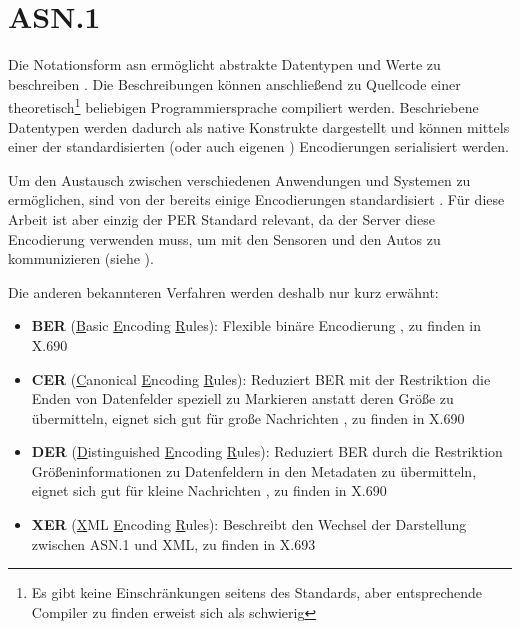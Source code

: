
\section{ASN.1}

Die Notationsform \gls{asn} ermöglicht abstrakte Datentypen und Werte zu beschreiben \cite{asn:layman}.
Die Beschreibungen können anschließend zu Quellcode einer theoretisch\footnote{Es gibt keine Einschränkungen seitens des Standards, aber entsprechende Compiler zu finden erweist sich als schwierig } beliebigen Programmiersprache compiliert werden.
Beschriebene Datentypen werden dadurch als native Konstrukte dargestellt und können mittels einer der standardisierten (oder auch eigenen \cite{asn:itu:ecn}) Encodierungen serialisiert werden.

Um den Austausch zwischen verschiedenen Anwendungen und Systemen zu ermöglichen, sind von der  bereits einige Encodierungen standardisiert \cite[8]{asn:itu:x691}.
Für diese Arbeit ist aber einzig der PER Standard relevant, da der Server diese Encodierung verwenden muss, um mit den Sensoren und den Autos zu kommunizieren (siehe ).

Die anderen bekannteren Verfahren werden deshalb nur kurz erwähnt:
\begin{itemize}
	\item \textbf{BER} (\underline{B}asic \underline{E}ncoding \underline{R}ules): Flexible binäre Encodierung \cite{asn:wiki:x690}, zu finden in X.690 \cite{asn:itu:x690}
	\item \textbf{CER} (\underline{C}anonical \underline{E}ncoding \underline{R}ules): Reduziert BER mit der Restriktion die Enden von Datenfelder speziell zu Markieren anstatt deren Größe zu übermitteln, eignet sich gut für große Nachrichten \cite{asn:wiki:x690}, zu finden in X.690 \cite{asn:itu:x690}
	\item \textbf{DER} (\underline{D}istinguished \underline{E}ncoding \underline{R}ules): Reduziert BER durch die Restriktion Größeninformationen zu Datenfeldern in den Metadaten zu übermitteln, eignet sich gut für kleine Nachrichten \cite{asn:wiki:x690}, zu finden in X.690 \cite{asn:itu:x690}
	\item \textbf{XER} (\underline{X}ML \underline{E}ncoding \underline{R}ules): Beschreibt den Wechsel der Darstellung zwischen ASN.1 und XML, zu finden in X.693 \cite{asn:itu:x693}
\end{itemize}


